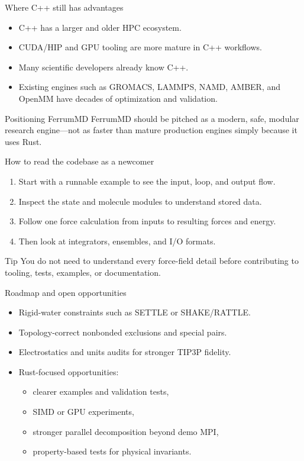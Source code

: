 \documentclass[aspectratio=169]{beamer}
\begin{document}
\begin{frame}{Where C++ still has advantages}
\begin{itemize}
  \item C++ has a larger and older HPC ecosystem.
  \item CUDA/HIP and GPU tooling are more mature in C++ workflows.
  \item Many scientific developers already know C++.
  \item Existing engines such as GROMACS, LAMMPS, NAMD, AMBER, and OpenMM have decades of optimization and validation.
\end{itemize}
\begin{block}{Positioning FerrumMD}
FerrumMD should be pitched as a modern, safe, modular research engine---not as faster than mature production engines simply because it uses Rust.
\end{block}
\end{frame}

\begin{frame}{How to read the codebase as a newcomer}
\begin{enumerate}
  \item Start with a runnable example to see the input, loop, and output flow.
  \item Inspect the state and molecule modules to understand stored data.
  \item Follow one force calculation from inputs to resulting forces and energy.
  \item Then look at integrators, ensembles, and I/O formats.
\end{enumerate}
\begin{block}{Tip}
You do not need to understand every force-field detail before contributing to tooling, tests, examples, or documentation.
\end{block}
\end{frame}

\begin{frame}{Roadmap and open opportunities}
\begin{itemize}
  \item Rigid-water constraints such as SETTLE or SHAKE/RATTLE.
  \item Topology-correct nonbonded exclusions and special pairs.
  \item Electrostatics and units audits for stronger TIP3P fidelity.
  \item Rust-focused opportunities:
  \begin{itemize}
    \item clearer examples and validation tests,
    \item SIMD or GPU experiments,
    \item stronger parallel decomposition beyond demo MPI,
    \item property-based tests for physical invariants.
  \end{itemize}
\end{itemize}
\end{frame}
\end{document}
